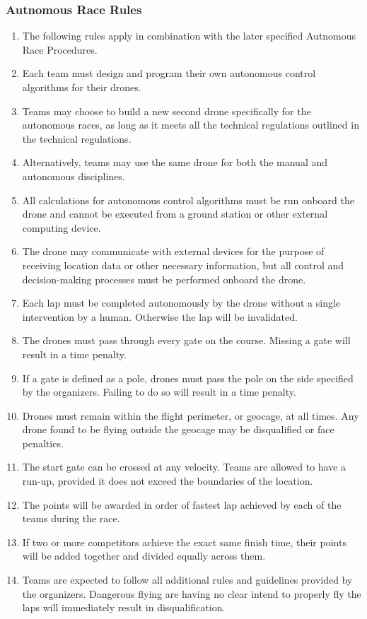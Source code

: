     \subsubsection{Autnomous Race Rules}
    \begin{enumerate}
    \item The following rules apply in combination with the later specified Autnomous Race Procedures.
    \item Each team must design and program their own autonomous control algorithms for their drones.
    \item Teams may choose to build a new second drone specifically for the autonomous races, as long as it meets all the technical regulations outlined in the technical regulations.
    \item Alternatively, teams may use the same drone for both the manual and autonomous disciplines.
    \item All calculations for autonomous control algorithms must be run onboard the drone and cannot be executed from a ground station or other external computing device.
    \item The drone may communicate with external devices for the purpose of receiving location data or other necessary information, but all control and decision-making processes must be performed onboard the drone.
    \item Each lap must be completed autonomously by the drone without a single intervention by a human. Otherwise the lap will be invalidated.
    \item The drones must pass through every gate on the course. Missing a gate will result in a time penalty.
    \item If a gate is defined as a pole, drones must pass the pole on the side specified by the organizers. Failing to do so will result in a time penalty.
    \item Drones must remain within the flight perimeter, or geocage, at all times. Any drone found to be flying outside the geocage may be disqualified or face penalties.
    \item The start gate can be crossed at any velocity. Teams are allowed to have a run-up, provided it does not exceed the boundaries of the location.
    \item The points will be awarded in order of fastest lap achieved by each of the teams during the race.
    \item If two or more competitors achieve the exact same finish time, their points will be added together and divided equally across them.
    \item Teams are expected to follow all additional rules and guidelines provided by the organizers. Dangerous flying are having no clear intend to properly fly the laps will immediately result in disqualification.
    \end{enumerate}

